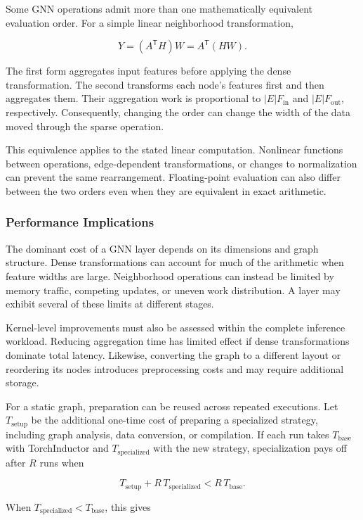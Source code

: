Some GNN operations admit more than one mathematically equivalent evaluation order. For a simple linear neighborhood transformation,

\[
  Y=(A^{\mathsf{T}}H)W=A^{\mathsf{T}}(HW).
\]

The first form aggregates input features before applying the dense transformation. The second transforms each node's features first and then aggregates them. Their aggregation work is proportional to $|E|F_{\mathrm{in}}$ and $|E|F_{\mathrm{out}}$, respectively. Consequently, changing the order can change the width of the data moved through the sparse operation.

This equivalence applies to the stated linear computation. Nonlinear functions between operations, edge-dependent transformations, or changes to normalization can prevent the same rearrangement. Floating-point evaluation can also differ between the two orders even when they are equivalent in exact arithmetic.

\subsubsection{Performance Implications}

The dominant cost of a GNN layer depends on its dimensions and graph structure. Dense transformations can account for much of the arithmetic when feature widths are large. Neighborhood operations can instead be limited by memory traffic, competing updates, or uneven work distribution. A layer may exhibit several of these limits at different stages.

Kernel-level improvements must also be assessed within the complete inference workload. Reducing aggregation time has limited effect if dense transformations dominate total latency. Likewise, converting the graph to a different layout or reordering its nodes introduces preprocessing costs and may require additional storage.

For a static graph, preparation can be reused across repeated executions. Let $T_{\mathrm{setup}}$ be the additional one-time cost of preparing a specialized strategy, including graph analysis, data conversion, or compilation. If each run takes $T_{\mathrm{base}}$ with TorchInductor and $T_{\mathrm{specialized}}$ with the new strategy, specialization pays off after $R$ runs when

\[
  T_{\mathrm{setup}}+R\,T_{\mathrm{specialized}}
  <R\,T_{\mathrm{base}}.
\]

When $T_{\mathrm{specialized}}<T_{\mathrm{base}}$, this gives

